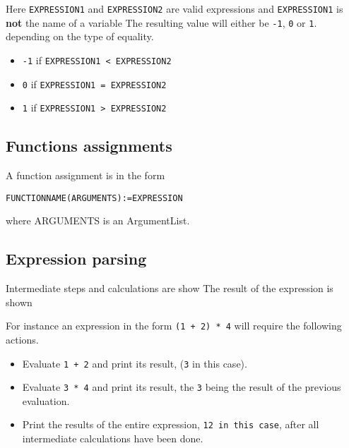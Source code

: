 \documentclass[11pt,a4paper]{article}
\begin{document}
Here \texttt{EXPRESSION1} and \texttt{EXPRESSION2} are valid
expressions and \texttt{EXPRESSION1} is \textbf{not} the name of a
variable The resulting value will either be \texttt{-1}, \texttt{0} or
\texttt{1}. depending on the type of equality.

\begin{itemize}
\item \texttt{-1} if \texttt{EXPRESSION1 < EXPRESSION2}
\item \texttt{0} if \texttt{EXPRESSION1 = EXPRESSION2}
\item \texttt{1} if \texttt{EXPRESSION1 > EXPRESSION2}
\end{itemize}

\subsection{Functions assignments}
A function assignment is in the form

\texttt{FUNCTIONNAME(ARGUMENTS):=EXPRESSION}

where ARGUMENTS is an ArgumentList.
\subsection{Expression parsing}
Intermediate steps and calculations are show
The result of the expression is shown

For instance an expression in the form \texttt{(1 + 2) * 4} will require the following actions.

\begin{itemize}
\item Evaluate \texttt{1 + 2} and print its result, (\texttt{3} in this case).
\item Evaluate \texttt{3 * 4} and print its result, the \texttt{3} being the result of the previous evaluation.
\item Print the results of the entire expression, \texttt{12 in this case}, after all intermediate calculations have been done.
\end{itemize}
\end{document}
